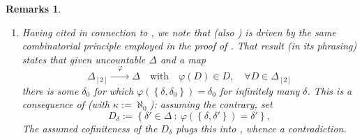 \documentclass[11pt,leqno]{article}
\theoremstyle{plain}
\theoremstyle{plain}
\theoremstyle{plain}
\newtheorem{remarks}[lemma]{Remarks}
\numberwithin{equation}{section}
\theoremstyle{nonumberplain}
\newcommand\1{{\bf 1}}
\begin{document}
\begin{remarks}
\begin{enumerate}[(1),wide]
    
  \item Having cited \cite{zbMATH03569401,MR450972} in connection to , we note that \cite[Lemma 1]{zbMATH03569401} (also \cite[proof of Theorem B.1, part 1]{MR450972}) is driven by the same combinatorial principle  employed in the proof of . That result (in its \cite[Lemma 1]{zbMATH03569401} phrasing) states that given uncountable $\Delta$ and a map
    \begin{equation*}
      \Delta_{[2]}\xrightarrow{\quad\varphi\quad}\Delta
      \quad\text{with}\quad
      \varphi(D)\in D
      ,\quad
      \forall D\in \Delta_{[2]}
    \end{equation*}
    there is some $\delta_0$ for which $\varphi(\left\{\delta,\delta_0\right\})=\delta_0$ for infinitely many $\delta$. This is a consequence of  (with $\kappa:=\aleph_0$): assuming the contrary, set
    \begin{equation*}
      D_{\delta}
      :=
      \left\{\delta'\in \Delta\ :\ \varphi\left(\left\{\delta,\delta'\right\}\right)=\delta'\right\},
    \end{equation*}
    The assumed cofiniteness of the $D_{\delta}$ plugs this into , whence a contradiction.


\end{enumerate}
\end{remarks}
\end{document}
